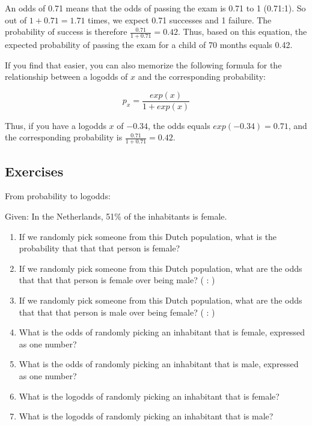 \documentclass[]{report}\usepackage[]{graphicx}\usepackage[]{color}
\begin{document}
An odds of 0.71 means that the odds of passing the exam is 0.71 to 1 (0.71:1). So out of $1 + 0.71= 1.71$ times, we expect 0.71 successes and 1 failure. The probability of success is therefore $\frac{0.71}{1+0.71} = 0.42$. Thus, based on this equation, the expected probability of passing the exam for a child of 70 months equals 0.42.

If you find that easier, you can also memorize the following formula for the relationship between a logodds of $x$ and the corresponding probability:


\begin{equation}
\label{eq:logistic1}
p_x = \frac{exp(x)}{1+exp(x)}
\end{equation}

Thus, if you have a logodds $x$ of $-0.34$, the odds equals $exp(-0.34)=0.71$, and
the corresponding probability is $\frac{0.71}{1+0.71} = 0.42$.


\subsection{Exercises}

From probability to logodds:

Given:
In the Netherlands, 51\% of the inhabitants is female.
\begin{enumerate}

\item
If we randomly pick someone from this Dutch population, what is the probability that that that person is female?


\item
If we randomly pick someone from this Dutch population, what are the odds that that that person is female over being male? ( : )

\item
If we randomly pick someone from this Dutch population, what are the odds that that that person is male over being female? ( : )

\item
What is the odds of randomly picking an inhabitant that is female, expressed as one number?

\item
What is the odds of randomly picking an inhabitant that is male, expressed as one number?


\item
What is the logodds of randomly picking an inhabitant that is female?

\item
What is the logodds of randomly picking an inhabitant that is male?


\end{enumerate}
\end{document}
